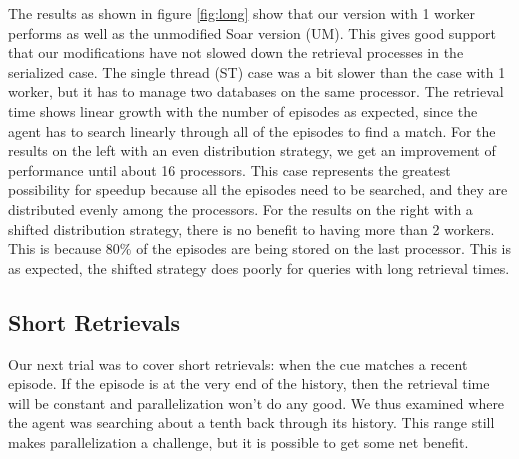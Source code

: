 \documentclass[11pt]{article} %
\begin{document}
The results as shown in figure \ref{fig:long} show that our version with 1 worker performs as well as the unmodified Soar version (UM). 
This gives good support that our modifications have not slowed down the retrieval processes in the serialized case. 
The single thread (ST) case was a bit slower than the case with 1 worker, but it has to manage two databases on the same processor. 
The retrieval time shows linear growth with the number of episodes 
as expected, since the agent has to search linearly through all of the episodes to find a match. 
For the results on the left with an even distribution strategy, we get an improvement of performance until about 16 processors. 
This case represents the greatest possibility for speedup because all the episodes need to be searched, and they are distributed evenly 
among the processors. For the results on the right with a shifted distribution strategy, there is no benefit to having more than 2 workers.
This is because $80\%$ of the episodes are being stored on the last processor. This is as expected, the shifted strategy does poorly for 
queries with long retrieval times. 


\subsection{Short Retrievals}
Our next trial was to cover short retrievals: when the cue matches a recent episode.  
If the episode is at the very end of the history, then the retrieval time will be constant and parallelization 
won't do any good. We thus examined where the agent was searching about a tenth back through its history. 
This range still makes parallelization a challenge, but it is possible to get some net benefit. 
\end{document}
